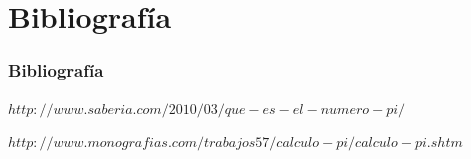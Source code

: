 \documentclass{beamer}
\begin{document}
\section{Bibliografía}
\begin{frame}
  \frametitle{Bibliografía}

  \begin{thebibliography}{10}

    \beamertemplatebookbibitems 
    {\small $ http://www.saberia.com/2010/03/que-es-el-numero-pi/$}

    \beamertemplatebookbibitems
    {\small $http://www.monografias.com/trabajos57/calculo-pi/calculo-pi.shtm$}

  \end{thebibliography}
\end{frame}

\end{document}
